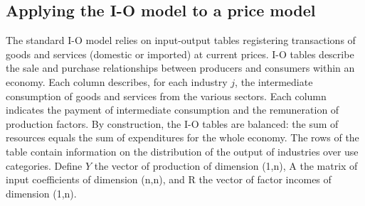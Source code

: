 \documentclass[11pt,a4paper]{article}
\begin{document}
\subsection{Applying the I-O model to a price model}
\label{subsec:ioprice}
The standard I-O model relies on input-output tables registering transactions of goods and services (domestic or imported) at current prices. I-O tables describe the sale and purchase relationships between producers and consumers within an economy. Each column describes, for each industry $j$, the intermediate consumption of goods and services from the various sectors. Each column indicates the payment of intermediate consumption and the remuneration of production factors. By construction, the I-O tables are balanced: the sum of resources equals the sum of expenditures for the whole economy. The rows of the table contain information on the distribution of the output of industries over use categories.
Define $Y$ the vector of production of dimension (1,n), A the matrix of input coefficients of dimension (n,n), and $\text{R}$ the vector of factor incomes of dimension (1,n).\\
\end{document}
